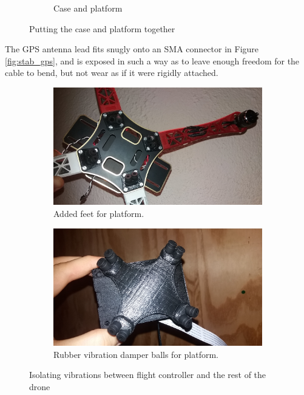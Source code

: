 \begin{figure}[H]
\begin{subfigure}{0.5\textwidth}
\caption{Case and platform}
\label{fig:stab_case_plat}
\end{subfigure}
\caption{Putting the case and platform together}
\label{fig:stabilize_platform}
\end{figure}

\noindent
The GPS antenna lead fits snugly onto an SMA connector in Figure \ref{fig:stab_gps}, and is exposed in such a way as to leave enough freedom for the cable to bend, but not wear as if it were rigidly attached.

\begin{figure}[H]
\begin{subfigure}{0.5\textwidth}
\centering
\includegraphics[scale=0.1]{images/drone-build-feet.jpg}
\caption{Added feet for platform.} 
\label{fig:feet}
\end{subfigure}
\begin{subfigure}{0.5\textwidth}
\centering
\includegraphics[scale=0.1]{images/drone-build-damper-balls.jpg}
\caption{Rubber vibration damper balls for platform.}
\label{fig:balls}
\end{subfigure}
\caption{Isolating vibrations between flight controller and the rest of the drone}
\label{fig:stabilize_platform}
\end{figure}

